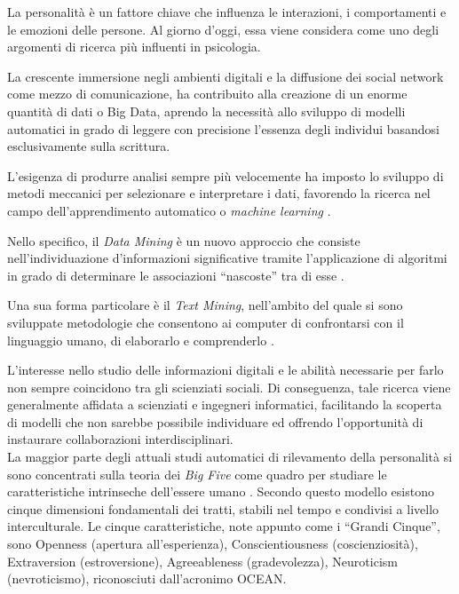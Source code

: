 La personalità è un fattore chiave che influenza le interazioni, i comportamenti e le emozioni delle persone. Al giorno d'oggi, essa viene considera come uno degli argomenti di ricerca più influenti in psicologia.

La crescente immersione negli ambienti digitali e la diffusione dei social network come mezzo di comunicazione, ha contribuito alla creazione di un enorme quantità di dati o Big Data, aprendo la necessità allo sviluppo di modelli automatici in grado di leggere con precisione l'essenza degli individui basandosi esclusivamente sulla scrittura.

L'esigenza di produrre analisi sempre più velocemente ha imposto lo sviluppo di metodi meccanici per selezionare e interpretare i dati, favorendo la ricerca nel campo dell'apprendimento automatico o \emph{machine learning} \cite{samuel1959some}.

Nello specifico, il \emph{Data Mining} è un nuovo approccio che consiste nell'individuazione d’informazioni significative tramite l'applicazione di algoritmi in grado di determinare le associazioni ``nascoste'' tra di esse  \cite{chakrabarti2006data,franklin2005elements}. 

Una sua forma particolare è il \emph{Text Mining}, nell'ambito del quale si sono sviluppate metodologie che consentono ai computer di confrontarsi con il linguaggio umano, di elaborarlo e comprenderlo \cite{tan1999text}.

L'interesse nello studio delle informazioni digitali e le abilità necessarie per farlo non sempre coincidono tra gli scienziati sociali. Di conseguenza, tale ricerca viene generalmente affidata a scienziati e ingegneri informatici, facilitando la scoperta di modelli che non sarebbe possibile individuare ed offrendo l'opportunità di instaurare collaborazioni interdisciplinari.
\\

La maggior parte degli attuali studi automatici di rilevamento della personalità si sono concentrati sulla teoria dei \emph{Big Five} come quadro per studiare le caratteristiche intrinseche dell'essere umano \cite{barrick1991big}.
Secondo questo modello esistono cinque dimensioni fondamentali dei tratti, stabili nel tempo e condivisi a livello interculturale. Le cinque caratteristiche, note appunto come i ``Grandi Cinque'', sono Openness (apertura all'esperienza), Conscientiousness (coscienziosità), Extraversion (estroversione), Agreeableness (gradevolezza), Neuroticism (nevroticismo), riconosciuti dall'acronimo OCEAN.

